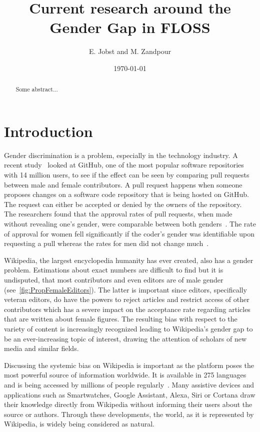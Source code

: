 \documentclass[a4paper, 11pt]{article}
\title{Current research around the Gender Gap in FLOSS}
\begin{document}
\date{\today}
\author{E. Jobst and M. Zandpour}
\maketitle

\begin{abstract}
Some abstract...
\end{abstract}

\section{Introduction} \label{sec:intro}
Gender discrimination is a problem, especially in the technology industry. A recent study~\cite{terrell2017gender} looked at GitHub, one of the most popular software repositories with 14 million users, to see if the effect can be seen by comparing pull requests between male and female contributors. A pull request happens when someone proposes changes on a software code repository that is being hosted on GitHub. The request can either be accepted or denied by the owners of the repository. The researchers found that the approval rates of pull requests, when made without revealing one’s gender, were comparable between both genders~\cite{terrell2017gender}. The rate of approval for women fell significantly if the coder’s gender was identifiable upon requesting a pull whereas the rates for men did not change much~\cite{terrell2017gender}.

Wikipedia, the largest encyclopedia humanity has ever created, also has a gender problem. Estimations about exact numbers are difficult to find but it is undisputed, that most contributors and even editors are of male gender (see~\autoref{fig:PropFemaleEditors}). The latter is important since editors, specifically veteran editors, do have the powers to reject articles and restrict access of other contributors which has a severe impact on the acceptance rate regarding articles that are written about female figures. The resulting bias with respect to the variety of content is increasingly recognized leading to Wikipedia’s gender gap to be an ever-increasing topic of interest, drawing the attention of scholars of new media and similar fields.

Discussing the systemic bias on Wikipedia is important as the platform poses the most powerful source of information worldwide. It is available in 275 languages and is being accessed by millions of people regularly~\cite{zachte2018}. Many assistive devices and applications such as Smartwatches, Google Assistant, Alexa, Siri or Cortana draw their knowledge directly from Wikipedia without informing their users about the source or authors. Through these developments, the world, as it is represented by Wikipedia, is widely being considered as natural.
\end{document}
